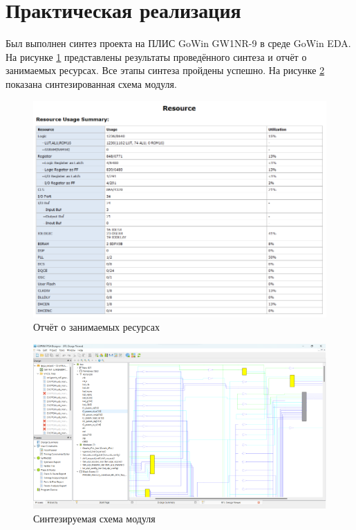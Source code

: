 \section{Практическая реализация}

Был выполнен синтез проекта на ПЛИС GoWin GW1NR-9 в среде GoWin EDA. На рисунке \ref{fig:synth_report} представлены результаты проведённого синтеза и отчёт о занимаемых ресурсах. Все этапы синтеза пройдены успешно. На рисунке \ref{fig:synth_rtl} показана синтезированная схема модуля.

\begin{figure}[ht!]
    \centering
    \includegraphics[scale=0.7]{res/img/synth_report.png}
    \caption{Отчёт о занимаемых ресурсах}
    \label{fig:synth_report}
\end{figure}


\begin{figure}[ht!]
    \centering
    \includegraphics[scale=0.7]{res/img/synth_rtl.png}
    \caption{Синтезируемая схема модуля}
    \label{fig:synth_rtl}
\end{figure}


